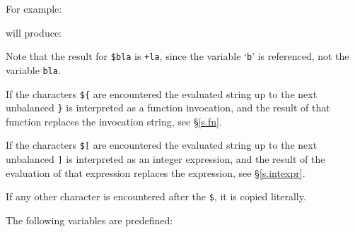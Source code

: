 For example:
\begin{showfile}

\end{showfile}
will produce:
\begin{showfile}

\end{showfile}
Note that the result for \verb+$bla+ is \texttt{+la}, since the
variable `\texttt{b}' is referenced, not the variable \texttt{bla}.

If the characters \texttt{\$\{} are encountered the evaluated string up to
the next unbalanced \texttt{\}} is interpreted as a function invocation,
and the result of that function replaces the invocation string,
see \S\ref{s.fn}.

If the characters \texttt{\$[} are encountered the evaluated string up
to the next unbalanced \texttt{]} is interpreted as an integer expression,
and the result of the evaluation of that expression replaces the expression,
see \S\ref{s.intexpr}.

If any other character is encountered after the \texttt{\$},
it is copied literally.

The following variables are predefined:

